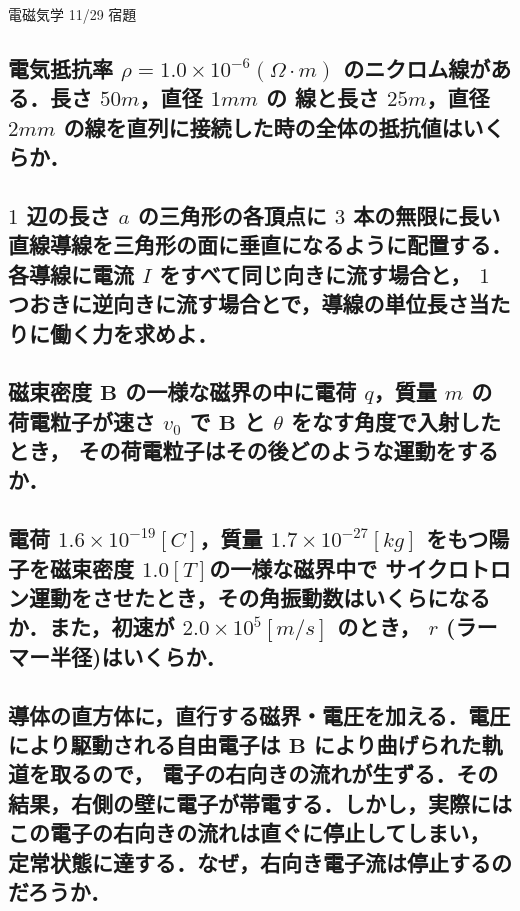 \documentclass[a4paper, 12pt]{bxjsarticle}
\begin{document}
\begin{center}
    \begin{huge}
        電磁気学 11/29 宿題
    \end{huge}
\end{center}

\subsection{電気抵抗率 \(\rho = 1.0\times10^{-6}\si{(\Omega \cdot m)}\) のニクロム線がある．長さ \(50\si{m}\)，直径 \(1\si{mm}\) の%
線と長さ \(25\si{m}\)，直径 \(2\si{mm}\) の線を直列に接続した時の全体の抵抗値はいくらか．}
\vspace{20em}

\subsection{\(1\) 辺の長さ \(a\) の三角形の各頂点に \(3\) 本の無限に長い直線導線を三角形の面に垂直になるように配置する．各導線に電流 \(I\) をすべて同じ向きに流す場合と，%
\(1\) つおきに逆向きに流す場合とで，導線の単位長さ当たりに働く力を求めよ．}

\newpage
\subsection{磁束密度 \(\boldsymbol{B}\) の一様な磁界の中に電荷 \(q\)，質量 \(m\) の荷電粒子が速さ \(v_0\) で \(\boldsymbol{B}\) と \(\theta\) をなす角度で入射したとき，%
その荷電粒子はその後どのような運動をするか．}
\vspace{20em}

\subsection{電荷 \(1.6\times10^{-19}\si{[C]}\)，質量 \(1.7\times10^{-27}\si{[kg]}\) をもつ陽子を磁束密度 \(1.0\si{[T]}\)の一様な磁界中で%
サイクロトロン運動をさせたとき，その角振動数はいくらになるか．また，初速が \(2.0\times10^{5}\si{[m/s]}\) のとき，%
\(r\) (ラーマー半径)はいくらか．}
\newpage

\subsection{導体の直方体に，直行する磁界・電圧を加える．電圧により駆動される自由電子は \(\boldsymbol{B}\) により曲げられた軌道を取るので，%
電子の右向きの流れが生ずる．その結果，右側の壁に電子が帯電する．しかし，実際にはこの電子の右向きの流れは直ぐに停止してしまい，%
定常状態に達する．なぜ，右向き電子流は停止するのだろうか．}
\end{document}
